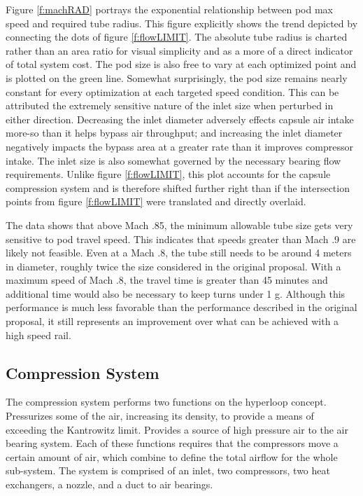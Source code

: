 \documentclass[heading.tex]{subfiles}
\begin{document}
Figure \ref{f:machRAD} portrays the exponential relationship between pod max speed and required tube radius. This figure explicitly shows the trend depicted by
connecting the dots of figure \ref{f:flowLIMIT}. The absolute tube radius is charted rather than an area ratio for visual simplicity and as a more of a direct indicator of total
system cost. The pod size is also free to vary at each optimized point and is plotted on the green line. Somewhat surprisingly, the pod size remains
nearly constant for every optimization at each targeted speed condition. This can be attributed the extremely sensitive nature of the inlet
size when perturbed in either direction. Decreasing the inlet diameter adversely effects capsule air intake more-so than it helps bypass air throughput; and
increasing the inlet diameter negatively impacts the bypass area at a greater rate than it improves compressor intake. The inlet size is also somewhat governed by the
necessary bearing flow requirements. Unlike figure \ref{f:flowLIMIT}, this plot accounts for
the capsule compression system and is therefore shifted further right than if the intersection points from figure \ref{f:flowLIMIT} were translated and directly
overlaid. 

The data shows that above Mach .85, the minimum allowable tube size gets very sensitive to pod travel speed. This indicates that speeds greater than Mach
.9 are likely not feasible. Even at a Mach .8, the tube still needs to be around 4 meters in diameter, roughly
twice the size considered in the original proposal. With a maximum speed of Mach .8, the travel time is greater than 45 minutes and additional time would also
be necessary to keep turns under 1 g. Although this performance is much less favorable than the performance
described in the original proposal, it still represents an improvement over what can be achieved with a high speed rail.


\subsection{Compression System}

The compression system performs two functions on the hyperloop concept.
Pressurizes some of the air, increasing its density, to provide a means of exceeding the Kantrowitz limit.
Provides a source of high pressure air to the air bearing system.
Each of these functions requires that the compressors move a certain amount of air, which combine to define the total airflow for the whole
sub-system. The system is comprised of an inlet, two compressors, two heat exchangers, a nozzle, and a duct to air bearings.
\end{document}

